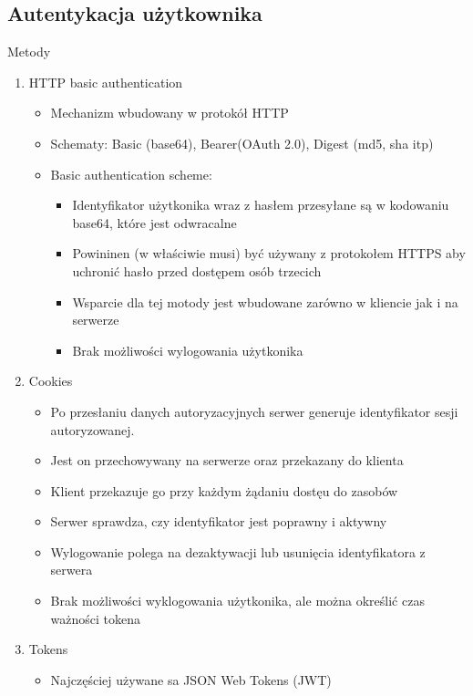 \documentclass[../main.tex]{subfiles}
\begin{document}
    \subsection{Autentykacja użytkownika}
    Metody
    \begin{enumerate}
        \item HTTP basic authentication
        \begin{itemize}
            \item Mechanizm wbudowany w protokół HTTP
            \item Schematy: Basic (base64), Bearer(OAuth 2.0), Digest (md5, sha itp)
            \item Basic authentication scheme:
            \begin{itemize}
                \item Identyfikator użytkonika wraz z hasłem przesyłane są w kodowaniu base64, które jest odwracalne
                \item Powininen (w właściwie musi) być używany z protokołem HTTPS aby uchronić hasło przed dostępem osób trzecich
                \item Wsparcie dla tej motody jest wbudowane zarówno w kliencie jak i na serwerze
                \item Brak możliwości wylogowania użytkonika
            \end{itemize}
        \end{itemize}
        \item Cookies
        \begin{itemize}
            \item Po przesłaniu danych autoryzacyjnych serwer generuje identyfikator sesji autoryzowanej.
            \item Jest on przechowywany na serwerze oraz przekazany do klienta
            \item Klient przekazuje go przy każdym żądaniu dostęu do zasobów
            \item Serwer sprawdza, czy identyfikator jest poprawny i aktywny
            \item Wylogowanie polega na dezaktywacji lub usunięcia identyfikatora z serwera
            \item Brak możliwości wyklogowania użytkonika, ale można określić czas ważności tokena
        \end{itemize}
        \item Tokens
        \begin{itemize}
            \item Najczęściej używane sa JSON Web Tokens (JWT)

\end{itemize}
\end{enumerate}
\end{document}
